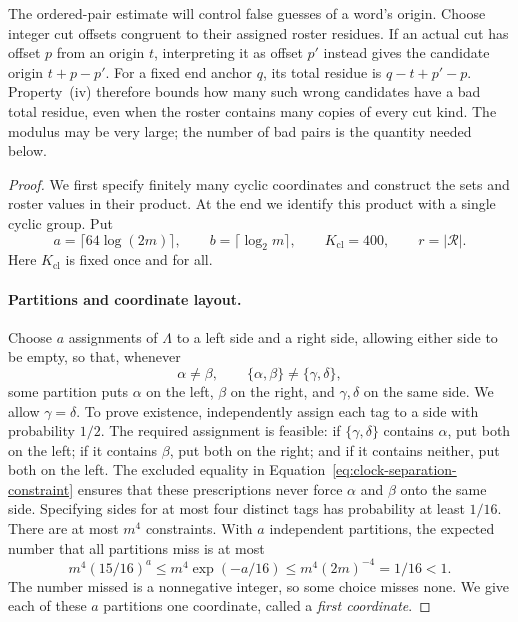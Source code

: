 The ordered-pair estimate will control false guesses of a word's origin.
Choose integer cut offsets congruent to their assigned roster residues.
If an actual cut has offset $p$ from an origin $t$, interpreting it as
offset $p'$ instead gives the candidate origin $t+p-p'$. For a fixed end
anchor $q$, its total residue is $q-t+p'-p$. Property~\textup{(iv)}
therefore bounds how many such wrong candidates have a bad total residue,
even when the roster contains many copies of every cut kind. The modulus
may be very large; the number of bad pairs is the quantity needed below.

\begin{proof}
We first specify finitely many cyclic coordinates and construct the sets
and roster values in their product.  At the end we identify this product
with a single cyclic group.  Put
\[
 a=\lceil64\log(2m)\rceil,\qquad
 b=\lceil\log_2 m\rceil,\qquad K_{\mathrm{cl}}=400,
 \qquad r=|\mathcal R|.
\]
Here $K_{\mathrm{cl}}$ is fixed once and for all.

\paragraph{Partitions and coordinate layout.}
Choose $a$ assignments of $\Lambda$ to a left side and a right side,
allowing either side to be empty, so that, whenever
\begin{equation}
 \alpha\ne\beta,\qquad
       \{\alpha,\beta\}\ne\{\gamma,\delta\},
 \label{eq:clock-separation-constraint}
\end{equation}
some partition puts $\alpha$ on the left, $\beta$ on the right, and
$\gamma,\delta$ on the same side.  We allow $\gamma=\delta$.
To prove existence, independently assign each tag to a side with
probability $1/2$.  The required assignment is feasible: if
$\{\gamma,\delta\}$ contains $\alpha$, put both on the left; if it
contains $\beta$, put both on the right; and if it contains neither,
put both on the left.  The excluded equality in
Equation~\eqref{eq:clock-separation-constraint} ensures that these prescriptions
never force $\alpha$ and $\beta$ onto the same side.  Specifying sides
for at most four distinct tags has probability at least $1/16$.
There are at most $m^4$ constraints.  With $a$ independent partitions,
the expected number that all partitions miss is at most
\[
 m^4(15/16)^a\le m^4\exp(-a/16)
                  \le m^4(2m)^{-4}=1/16<1.
\]
The number missed is a nonnegative integer, so some choice misses none.
We give each of these $a$ partitions one coordinate, called a
\emph{first coordinate}.


\end{proof}

